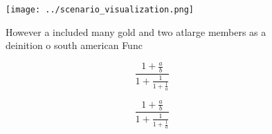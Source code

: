 \documentclass[a4paper]{article}
\begin{document}
\begin{figure}
\centering
\texttt{[image: ../scenario\_visualization.png]}
\caption{However a included many gold and two atlarge members as a deinition o south american Func
}
\end{figure}
 
\[ \frac{1+\frac{a}{b}}{1+\frac{1}{1+\frac{1}{a}}} \]

\[ \frac{1+\frac{a}{b}}{1+\frac{1}{1+\frac{1}{a}}} \]
\end{document}
